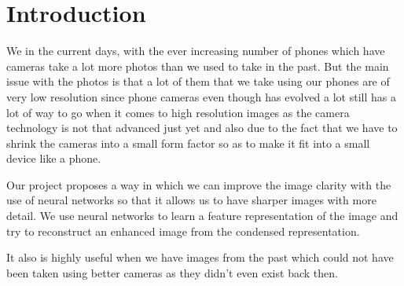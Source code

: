 \chapter{Introduction}

We in the current days, with the ever increasing number of phones which have cameras take a lot more photos than we used to take in the past. But the main issue with the photos is that a lot of them that we take using our phones are of very low resolution since phone cameras even though has evolved a lot still has a lot of way to go when it comes to high resolution images as the camera technology is not that advanced just yet and also due to the fact that we have to shrink the cameras into a small form factor so as to make it fit into a small device like a phone. 

Our project proposes a way in which we can improve the image clarity with the use of neural networks so that it allows us to have sharper images with more detail. We use neural networks to learn a feature representation of the image and try to reconstruct an enhanced image from the condensed representation.

It also is highly useful when we have images from the past which could not have been taken using better cameras as they didn't even exist back then.
